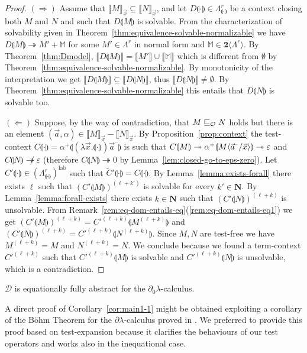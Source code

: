 \documentclass{LMCS}
\newcommand{\nak}[1]{\tilde{#1}}
\newcommand{\nat}{\mathbf{N}}
\newcommand{\bool}{\mathbf{2}}
\newcommand{\dlam}{\ensuremath{\partial\lambda}}
\newcommand{\dzlam}{\ensuremath{\partial_0\lambda}}
\newcommand{\lam}{\ensuremath{\lambda}}
\renewcommand{\hole}[1]{\llparenthesis #1\rrparenthesis}
\newcommand{\Set}[1]{\Lambda^{#1}}
\newcommand{\sums}[1]{\bool\langle\Set{#1}\rangle}
\newcommand{\msto}{\twoheadrightarrow}
\newcommand{\Int}[1]{\llbracket #1\rrbracket} \newcommand{\trm}[1]{#1^{\textrm{--}}}
\newcommand{\cont}[2]{#1^{+}\hole{#2}}
\newcommand{\seq}[1]{\vec{#1}}
\newcommand{\sM}{\mathbb{M}}
\newcommand\lab{\mathrm{lab}}
\newcommand{\cD}{\mathcal{D}}
\begin{document}
\begin{proof} $(\Rightarrow)$
Assume that $\Int{M}_{\seq x}\subseteq\Int{N}_{\seq x}$, 
and let  $D\hole{\cdot}\in\Set{r}_{\hole{\cdot}}$ be a context closing both $M$ and 
$N$ and such that $D\hole{M}$ is solvable.
From the characterization of solvability given in Theorem~\ref{thm:equivalence-solvable-normalizable}
we have $D\hole{M}\msto M' + \sM$ for some $M'\in\Set{r}$ in normal form and $\sM\in\sums{r}$.
By Theorem~\ref{thm:Dmodel}, $\Int{D\hole{M}} = \Int{M'}\cup\Int{\sM}$ which is different from $\emptyset$ by Theorem~\ref{thm:equivalence-solvable-normalizable}.
By monotonicity of the interpretation we get $\Int{D\hole{M}}\subseteq\Int{D\hole{N}}$,
thus $\Int{D\hole{N}}\neq\emptyset$. 
By Theorem~\ref{thm:equivalence-solvable-normalizable} this entails that $D\hole{N}$ is solvable too. 


$(\Leftarrow)$ Suppose, by the way of contradiction, that $M\sqsubseteq_{\mathcal{O}} N$ holds but 
there is an element $(\seq a,\alpha)\in\Int{M}_{\seq x}-\Int{N}_{\seq x}$.
By Proposition~\ref{prop:context} the test-context $C\hole{\cdot} = \cont{\alpha}{(\lam\seq x.\hole{\cdot})\trm{\seq{a}}}$
is such that $C\hole{M}\msto \cont{\alpha}{M\lsubst{\seq{x}}{\trm{\seq{a}}}}\msto \varepsilon$
and $C\hole{N}\not\msto \varepsilon$ (therefore $C\hole{N}\msto 0$ by Lemma~\ref{lem:closed-go-to-eps-zero}). 
Let $C'\hole{\cdot}\in(\Set{r}_{\hole{\cdot}})^\lab$ such that $\nak C'\hole{\cdot} = C\hole{\cdot}$.
By Lemma~\ref{lemma:exists-forall} there exists $\ell$ such that $(C'\hole{M})^{(\ell + k')}$ is solvable for every $k'\in\nat$. 
By Lemma~\ref{lemma:forall-exists} there exists $k\in\nat$ such that $(C'\hole{N})^{(\ell+k)}$ is unsolvable.
From Remark~\ref{rem:eq-dom-entails-eq}(\ref{rem:eq-dom-entails-eq1}) we get $(C'\hole{M})^{(\ell + k)} = C'^{(\ell + k)}\hole{M^{(\ell + k)}}$
and $(C'\hole{N})^{(\ell + k)} = C'^{(\ell + k)}\hole{N^{(\ell + k)}}$.
Since $M,N$ are test-free we have $M^{(\ell + k)} = M$ and $N^{(\ell + k)} = N$.
We conclude because we found a term-context $C'^{(\ell + k)}$ such that
$C'^{(\ell + k)}\hole{M}$ is solvable and $C'^{(\ell + k)}\hole{N}$ is unsolvable,
which is a contradiction.
\end{proof}

\begin{cor}\label{cor:main1-1}
$\cD$ is equationally fully abstract for the \dzlam-calculus.
\end{cor}

\begin{rem} A direct proof of Corollary~\ref{cor:main1-1} might be obtained exploiting a corollary of the B\"ohm Theorem for 
the $\dlam$-calculus proved in \cite{ManzonettoP11}.
We preferred to provide this proof based on test-expansion because it clarifies the behaviours of our test operators and works also in the inequational case.
\end{rem}
\end{document}
